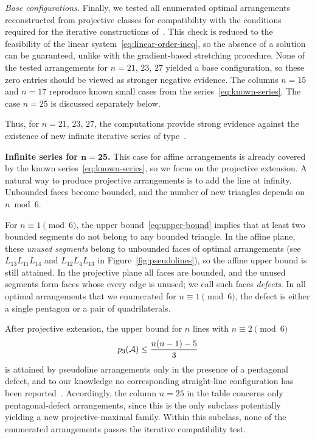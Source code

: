 \emph{Base configurations.}
Finally, we tested all enumerated optimal arrangements reconstructed
from projective classes for compatibility with the conditions required
for the iterative constructions of~\cite{forge1998,bartholdi2007}.
This check is reduced to the feasibility of the linear
system~\eqref{eq:linear-order-ineq}, so the absence of a solution
can be guaranteed, unlike with the gradient-based stretching procedure.
None of the tested arrangements for $n=21$, $23$, $27$
yielded a base configuration, so these zero entries
should be viewed as stronger negative evidence.
The columns $n=15$ and $n=17$ reproduce known small cases
from the series~\eqref{eq:known-series}.
The case $n=25$ is discussed separately below.

Thus, for $n=21$, $23$, $27$, the
computations provide strong evidence against the existence of new
infinite iterative series of type~\cite{forge1998,bartholdi2007}.

\textbf{Infinite series for $\boldsymbol{n=25}$.}
This case for affine arrangements is already covered by the known
series~\eqref{eq:known-series}, so we focus on the projective extension.
A natural way to produce projective arrangements is to add the line at
infinity. Unbounded faces become bounded, and the number of new triangles
depends on $n\bmod 6$.

For $n\equiv 1\pmod{6}$, the upper bound~\eqref{eq:upper-bound} implies that at least two
bounded segments do not belong to any bounded triangle.
In the affine plane, these \emph{unused segments}
belong to unbounded faces of optimal arrangements (see
$L_{13}L_{11}L_{14}$ and $L_{12}L_{4}L_{13}$ in
Figure~\ref{fig:pseudolines}), so the affine
upper bound is still attained. In the projective plane all faces are bounded,
and the unused segments form faces whose every edge is unused;
we call such faces \emph{defects}. In all optimal
arrangements that we enumerated for $n\equiv 1\pmod{6}$, the defect
is either a single pentagon or a pair of quadrilaterals.

After projective extension, the upper bound for $n$ lines with
$n\equiv 2\pmod{6}$
\begin{equation}\label{eq:blanc-projective-bound}
  p_3(\mathcal{A})\le \frac{n(n-1)-5}{3}
\end{equation}
is attained by pseudoline arrangements only in the presence of a
pentagonal defect, and to our knowledge no corresponding straight-line
configuration has been reported~\cite{blanc2011}.
Accordingly, the column $n=25$ in the
table concerns only pentagonal-defect arrangements, since this is the
only subclass potentially yielding a new projective-maximal family.
Within this subclass, none of the enumerated arrangements passes the
iterative compatibility test.

